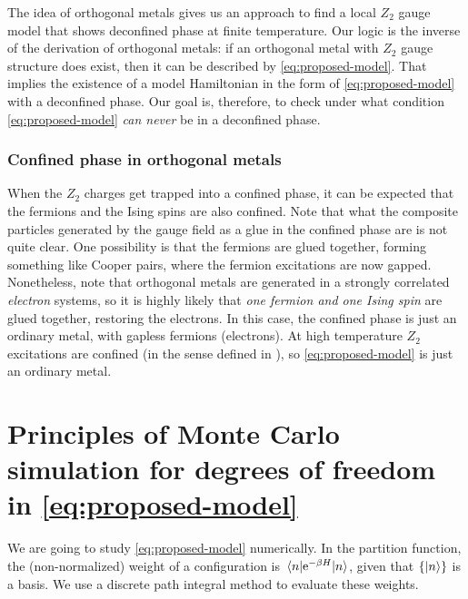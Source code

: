 \documentclass[hyperref, a4paper]{article}
\newcommand*{\ee}{\mathrm{e}}
\newcommand*{\Ztwo}{$\mathbb{Z}_2$ }
\def\mathbb#1{#1}%
\begin{document}
The idea of orthogonal metals gives us an approach to find a local \Ztwo gauge model that shows deconfined phase at finite temperature.
Our logic is the inverse of the derivation of orthogonal metals: if an orthogonal metal with \Ztwo gauge structure does exist, then it can be described by \eqref{eq:proposed-model}.
That implies the existence of a model Hamiltonian in the form of \eqref{eq:proposed-model} with a deconfined phase.
Our goal is, therefore, to check under what condition \eqref{eq:proposed-model} \emph{can never} be in a deconfined phase.

\subsubsection{Confined phase in orthogonal metals}

When the \Ztwo charges get trapped into a confined phase, it can be expected that the fermions and the Ising spins are also confined.
Note that what the composite particles generated by the gauge field as a glue in the confined phase are is not quite clear.
One possibility is that the fermions are glued together, forming something like Cooper pairs, where the fermion excitations are now gapped.
Nonetheless, note that orthogonal metals are generated in a strongly correlated \emph{electron} systems, so it is highly likely that \emph{one fermion and one Ising spin} are glued together, restoring the electrons.
In this case, the confined phase is just an ordinary metal, with gapless fermions (electrons).
At high temperature \Ztwo excitations are confined (in the sense defined in ), so \eqref{eq:proposed-model} is just an ordinary metal.

\section{Principles of Monte Carlo simulation for degrees of freedom in \eqref{eq:proposed-model}}

We are going to study \eqref{eq:proposed-model} numerically.
In the partition function, the (non-normalized) weight of a configuration is $\mel{n}{\ee^{-\beta H}}{n}$, given that $\{\ket{n}\}$ is a basis.
We use a discrete path integral method to evaluate these weights.
\end{document}
